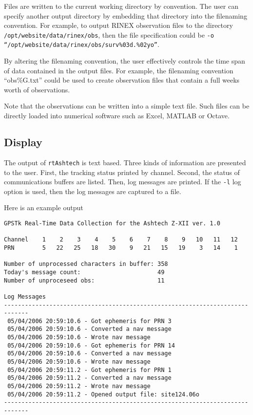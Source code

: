 Files are written to the current working directory by convention. The
user can specify another output directory by embedding that directory
into the filenaming convention. For example, to output RINEX observation
files to the directory \texttt{/opt/website/data/rinex/obs}, then the
file specification could be 
\texttt{-o ``/opt/website/data/rinex/obs/surv\%03d.\%02yo''}.

By altering the filenaming convention, the user effectively controls the time
span of data contained in the output files. For example, the filenaming 
convention ``obs\%G.txt'' could be used to create observation files that 
contain a full weeks worth of observations.

Note that the observations can be written into a simple text file. Such
files can be directly loaded into numerical software such as Excel, MATLAB
or Octave. 
\subsection{Display}

The output of \texttt{rtAshtech} is text based. Three kinds of information
are presented to the user. First, the tracking status printed by channel.
Second, the status of communications buffers are listed. Then, log
messages are printed. If the \texttt{-l} log option is used, then the
log messages are captured to a file. 

Here is an example output

\small
\begin{singlespace}
\begin{verbatim}
GPSTk Real-Time Data Collection for the Ashtech Z-XII ver. 1.0

Channel    1    2    3    4    5    6    7    8    9   10   11   12
PRN        5   22   25   18   30    9   21   15   19    3   14    1

Number of unprocessed characters in buffer: 358
Today's message count:                      49
Number of unproceseed obs:                  11

Log Messages
-----------------------------------------------------------------------------
 05/04/2006 20:59:10.6 - Got ephemeris for PRN 3
 05/04/2006 20:59:10.6 - Converted a nav message
 05/04/2006 20:59:10.6 - Wrote nav message
 05/04/2006 20:59:10.6 - Got ephemeris for PRN 14
 05/04/2006 20:59:10.6 - Converted a nav message
 05/04/2006 20:59:10.6 - Wrote nav message
 05/04/2006 20:59:11.2 - Got ephemeris for PRN 1
 05/04/2006 20:59:11.2 - Converted a nav message
 05/04/2006 20:59:11.2 - Wrote nav message
 05/04/2006 20:59:11.2 - Opened output file: site124.06o
-----------------------------------------------------------------------------
\end{verbatim}
\end{singlespace}
\normalsize

